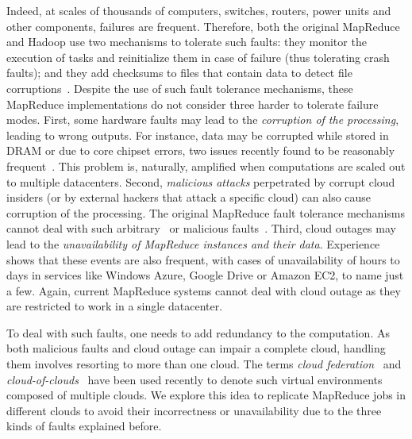 \documentclass[10pt, conference, compsocconf]{IEEEtran}
\begin{document}
Indeed, at scales of thousands of computers, switches, routers, power units and other components, failures are frequent.
Therefore, both the original MapReduce and Hadoop use two mechanisms to tolerate such faults: they monitor the execution of tasks and reinitialize them in case of failure (thus tolerating crash faults); and they add checksums to files that contain data to detect file corruptions~\cite{Ghemawat:03,White:09}.
Despite the use of such fault tolerance mechanisms, these MapReduce implementations do not consider three harder to tolerate failure modes.
First, some hardware faults may lead to the \emph{corruption of the processing}, leading to wrong outputs.
For instance, data may be corrupted while stored in DRAM or due to core chipset errors, two issues recently found to be reasonably frequent~\cite{Schroeder:09,Nightingale:11}.
This problem is, naturally, amplified when computations are scaled out to multiple datacenters.
Second, \emph{malicious attacks} perpetrated by corrupt cloud insiders (or by external hackers that attack a specific cloud) can also cause corruption of the processing.
The original MapReduce fault tolerance mechanisms cannot deal with such arbitrary~\cite{Avi04} or malicious faults~\cite{Ver03}.
Third, cloud outages may lead to the \emph{unavailability of MapReduce instances and their data}.
Experience shows that these events are also frequent, with cases of unavailability of hours to days in services like Windows Azure, Google Drive or Amazon EC2, to name just a few.
Again, current MapReduce systems cannot deal with cloud outage as they are restricted to work in a single datacenter.

To deal with such faults, one needs to add redundancy to the computation.
As both malicious faults and cloud outage can impair a complete cloud, handling them involves resorting to more than one cloud.
The terms \emph{cloud federation}~\cite{kurze2011cf} and \emph{cloud-of-clouds}~\cite{Bessani:2011:DDS:1966445.1966449} have been used recently to denote such virtual environments composed of multiple clouds.
We explore this idea to replicate MapReduce jobs in different clouds to avoid their incorrectness or unavailability due to the three kinds of faults explained before.
\end{document}
